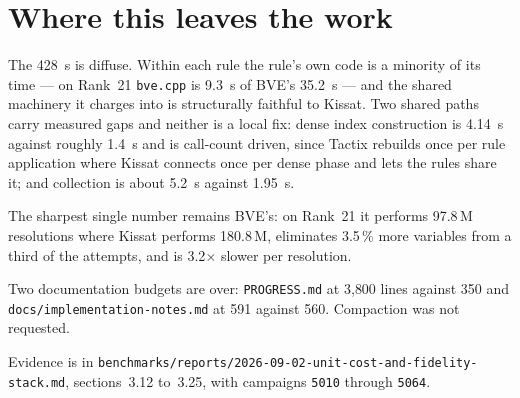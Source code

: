 \documentclass[11pt]{article}
\newcommand{\code}[1]{\texttt{#1}}
\begin{document}
\section{Where this leaves the work}

The 428~s is diffuse. Within each rule the rule's own code is a minority of its
time --- on Rank~21 \code{bve.cpp} is 9.3~s of BVE's 35.2~s --- and the shared
machinery it charges into is structurally faithful to Kissat. Two shared paths
carry measured gaps and neither is a local fix: dense index construction is
4.14~s against roughly 1.4~s and is call-count driven, since Tactix rebuilds
once per rule application where Kissat connects once per dense phase and lets
the rules share it; and collection is about 5.2~s against 1.95~s.

The sharpest single number remains BVE's: on Rank~21 it performs 97.8\,M
resolutions where Kissat performs 180.8\,M, eliminates 3.5\,\% more variables
from a third of the attempts, and is 3.2$\times$ slower per resolution.

Two documentation budgets are over: \code{PROGRESS.md} at 3{,}800 lines against
350 and \code{docs/implementation-notes.md} at 591 against 560. Compaction was
not requested.

Evidence is in
\code{benchmarks/reports/2026-09-02-unit-cost-and-fidelity-stack.md},
sections~3.12 to~3.25, with campaigns \code{5010} through \code{5064}.
\end{document}

